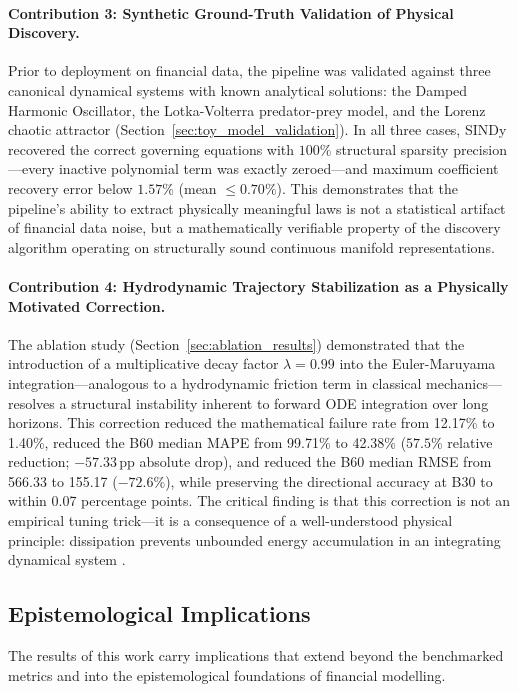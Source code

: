 \documentclass[11pt,a4paper]{article}
\begin{document}
\paragraph{Contribution 3: Synthetic Ground-Truth Validation of Physical Discovery.}
Prior to deployment on financial data, the pipeline was validated against three canonical dynamical systems with known analytical solutions: the Damped Harmonic Oscillator, the Lotka-Volterra predator-prey model, and the Lorenz chaotic attractor (Section~\ref{sec:toy_model_validation}). In all three cases, SINDy recovered the correct governing equations with $100\%$ structural sparsity precision---every inactive polynomial term was exactly zeroed---and maximum coefficient recovery error below $1.57\%$ (mean $\leq 0.70\%$). This demonstrates that the pipeline's ability to extract physically meaningful laws is not a statistical artifact of financial data noise, but a mathematically verifiable property of the discovery algorithm operating on structurally sound continuous manifold representations.

\paragraph{Contribution 4: Hydrodynamic Trajectory Stabilization as a Physically Motivated Correction.}
The ablation study (Section~\ref{sec:ablation_results}) demonstrated that the introduction of a multiplicative decay factor $\lambda = 0.99$ into the Euler-Maruyama integration---analogous to a hydrodynamic friction term in classical mechanics---resolves a structural instability inherent to forward ODE integration over long horizons. This correction reduced the mathematical failure rate from 12.17\% to 1.40\%, reduced the B60 median MAPE from 99.71\% to 42.38\% ($57.5\%$ relative reduction; $-57.33\,\text{pp}$ absolute drop), and reduced the B60 median RMSE from 566.33 to 155.17 ($-72.6\%$), while preserving the directional accuracy at B30 to within 0.07 percentage points. The critical finding is that this correction is not an empirical tuning trick---it is a consequence of a well-understood physical principle: dissipation prevents unbounded energy accumulation in an integrating dynamical system \cite{kloeden1992numerical}.

\subsection{Epistemological Implications}

The results of this work carry implications that extend beyond the benchmarked metrics and into the epistemological foundations of financial modelling.
\end{document}
